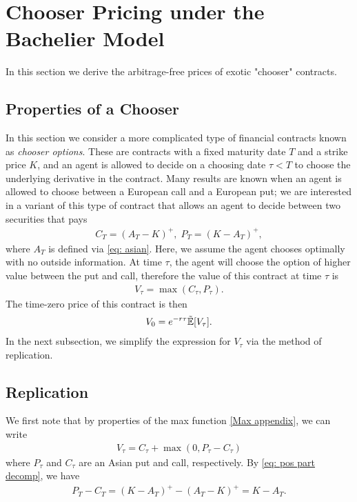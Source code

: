 \documentclass[reqno]{amsart}
\begin{document}
\section{Chooser Pricing under the Bachelier Model}
In this section we derive the arbitrage-free prices of exotic "chooser" contracts.
\subsection{Properties of a Chooser}
In this section we consider a more complicated type of financial contracts known as \emph{chooser options}. 
These are contracts with a fixed maturity date $T$ and a strike price $K$, and an agent is allowed to decide on a choosing date $\tau < T$ to choose the underlying derivative in the contract.
Many results are known when an agent is allowed to choose between a European call and a European put; we are interested in a variant of this type of contract that allows an agent to decide between two securities that pays 
\begin{align}
     C_T = (A_T - K)^+, \; P_T = (K - A_T)^+,
\end{align}
where $A_T$ is defined via \eqref{eq: asian}.
Here, we assume the agent chooses optimally with no outside information. At time $\tau$, the agent will choose the option of higher value between the put and call, therefore the value of this contract at time $\tau$ is 
\begin{align}\label{eq: V_tau}
     V_\tau = \max(C_\tau, P_\tau).
\end{align}
The time-zero price of this contract is then 
\begin{align}
      V_0 = e^{-r\tau}\tilde{\mathbb{E}}[V_\tau].
\end{align}
In the next subsection, we simplify the expression for $V_\tau$ via the method of replication. 
\subsection{Replication}
We first note that by properties of the max function \eqref{Max appendix}, we can write 
\begin{align}\label{eq: chooser formula PC}
     V_\tau = C_\tau + \max(0, P_\tau - C_\tau)
\end{align}
where $P_\tau$ and $C_\tau$ are an Asian put and call, respectively.
By \eqref{eq: pos part decomp}, we have
\begin{align}\label{eq: P - C}
     P_T - C_T = (K-A_T)^+ - (A_T - K)^+ = K - A_T. 
\end{align}
\end{document}
